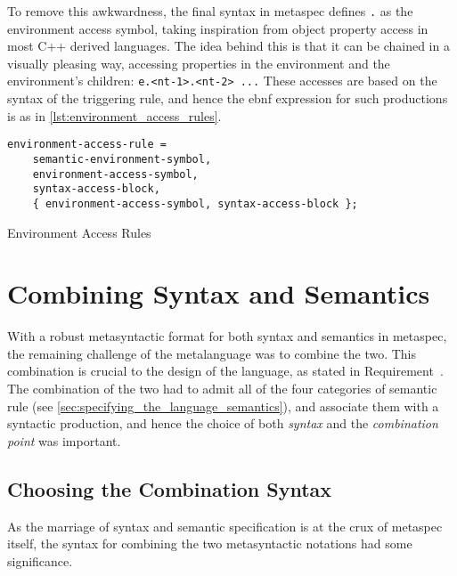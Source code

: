 To remove this awkwardness, the final syntax in \gls{metaspec} defines \texttt{.} as the environment access symbol, taking inspiration from object property access in most C++ derived languages.
The idea behind this is that it can be chained in a visually pleasing way, accessing properties in the environment and the environment's children: \texttt{e.<nt-1>.<nt-2> ...}
These accesses are based on the syntax of the triggering rule, and hence the \gls{ebnf} expression for such productions is as in \autoref{lst:environment_access_rules}.

\begin{listing}[!htb]
\begin{verbatim}
environment-access-rule = 
    semantic-environment-symbol,
    environment-access-symbol,
    syntax-access-block,
    { environment-access-symbol, syntax-access-block }; 
\end{verbatim}
\caption{Environment Access Rules}
\label{lst:environment_access_rules}
\end{listing}




\section{Combining Syntax and Semantics} %
\label{sec:combining_syntax_and_semantics}
With a robust metasyntactic format for both syntax and semantics in \gls{metaspec}, the remaining challenge of the metalanguage was to combine the two. 
This combination is crucial to the design of the language, as stated in Requirement~.
The combination of the two had to admit all of the four categories of semantic rule (see \autoref{sec:specifying_the_language_semantics}), and associate them with a syntactic production, and hence the choice of both \textit{syntax} and the \textit{combination point} was important. 

\subsection{Choosing the Combination Syntax} %
\label{sub:choosing_the_combination_syntax}
As the marriage of syntax and semantic specification is at the crux of \gls{metaspec} itself, the syntax for combining the two metasyntactic notations had some significance. \\

